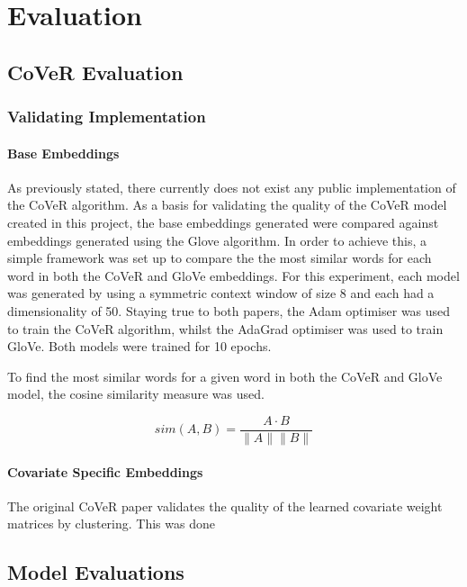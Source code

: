 \chapter{Evaluation}
\label{chap:evaluation}
\section{CoVeR Evaluation}
\subsection{Validating Implementation}
\subsubsection{Base Embeddings}
As previously stated, there currently does not exist any public implementation of the CoVeR algorithm. As a basis for validating the quality of the CoVeR model created in this project, the base embeddings generated were compared against embeddings generated using the Glove algorithm. In order to achieve this, a simple framework was set up to compare the the most similar words for each word in both the CoVeR and GloVe embeddings. For this experiment, each model was generated by using a symmetric context window of size 8 and each had a dimensionality of 50. Staying true to both papers, the Adam optimiser was used to train the CoVeR algorithm, whilst the AdaGrad optimiser was used to train GloVe. Both models were trained for 10 epochs. 

\noindent
\newline
To find the most similar words for a given word in both the CoVeR and GloVe model, the cosine similarity measure was used.

\begin{equation}
sim(A, B) =\dfrac{A \cdot B}{\lVert A \rVert \lVert B \rVert}
\end{equation}



\subsubsection{Covariate Specific Embeddings}
The original CoVeR paper validates the quality of the learned covariate weight matrices by clustering. This was done 
\section{Model Evaluations}
